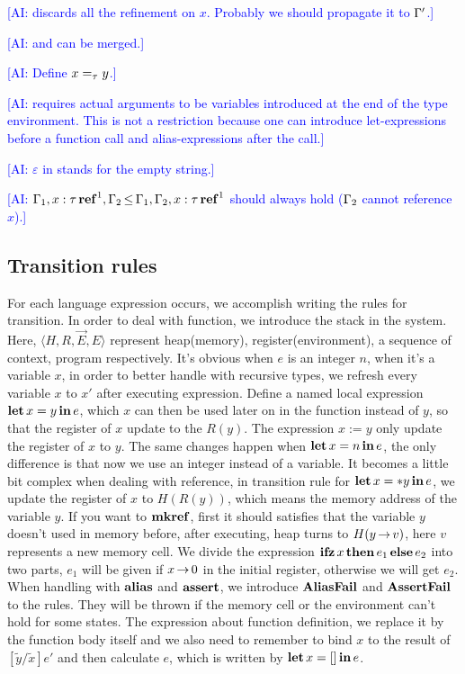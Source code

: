\documentclass[runningheads]{llncs}
\newcommand{\AI}[1]{\textcolor{blue}{[AI: #1]\marginpar{$\longleftarrow$}}}
\begin{document}
\AI{ discards all the refinement on \(x\).  Probably we should propagate it to $\Gamma'$.}

\AI{ and  can be merged.}

\AI{Define \(x =_\tau y\).}

\AI{ requires actual arguments to be variables introduced at the end of the type environment.  This is not a restriction because one can introduce let-expressions before a function call and alias-expressions after the call.}

\AI{$\varepsilon$ in  stands for the empty string.}

\AI{$\Gamma_1, x:\tau \operatorname{\mathbf{ref}}^1, \Gamma_2 \operatorname{\le} \Gamma_1, \Gamma_2, x:\tau \operatorname{\mathbf{ref}}^1$ should always hold ($\Gamma_2$ cannot reference $x$).}

\subsection{Transition rules}
For each language expression occurs, we accomplish writing the rules for transition. In order to deal with function, we introduce the stack in the system. Here, $\langle H, R,\overrightarrow{E}, E \rangle$ represent heap(memory),
register(environment), a sequence of context, program respectively.
It's obvious when $e$ is an integer $n$, when it's a variable $x$, in order to better handle with recursive types,
we refresh every variable $x$ to $x'$ after executing expression.
Define a named local expression $\operatorname{\mathbf{let}} x=y \operatorname{\mathbf{in}} e$, which $x$ can then be used later on in the function instead of $y$, so that the
register of $x$ update to the $R(y)$.
The expression $x:=y$ only update the register of $x$ to $y$.
The same changes happen when $\operatorname{\mathbf{let}} x=n \operatorname{\mathbf{in}} e$, the only difference is that now we use an integer instead of a variable.
It becomes a little bit complex when dealing with reference, in transition rule for $\operatorname{\mathbf{let}} x=*y \operatorname{\mathbf{in}} e$, we update the register of $x$ to $H(R(y))$,
which means the memory address of the variable $y$.
If you want to $\operatorname{\mathbf{mkref}}$, first it should satisfies that the variable $y$ doesn't used in memory before, after executing, heap
turns to $H(y\operatorname{\rightarrow} v)$, here $v$ represents a new memory cell.
We divide the expression $\operatorname{\mathbf{ifz}} x\operatorname{\mathbf{then}} e_1 \operatorname{\mathbf{else}} e_2$ into two parts, $e_1$ will be given if $x\operatorname{\rightarrow} 0$ in the initial register,
otherwise we will get $e_2$.
When handling with $\mathbf{alias}$ and $\mathbf{assert}$, we introduce $\bf{AliasFail}$ and $\bf{AssertFail}$ to the rules. They will be thrown if the memory cell or
the environment can't hold for some states.
The expression about function definition, we replace it by the function body itself and we also need to remember to bind $x$ to
the result of $[\tilde{y}/\tilde{x}]e'$ and then calculate $e$, which is written by $\operatorname{\mathbf{let}} x=[] \operatorname{\mathbf{in}} e$.
\end{document}
